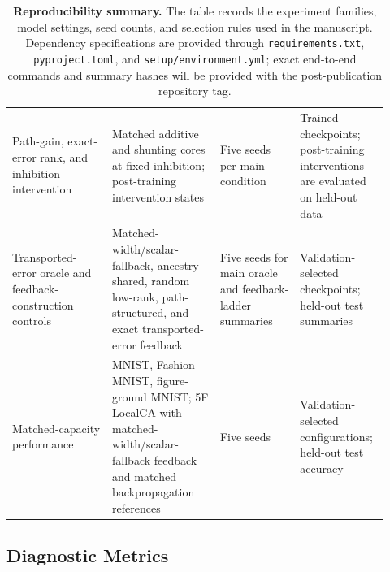 \begin{table}[htbp]
\begin{tabular}{@{}L{0.25\linewidth}L{0.27\linewidth}L{0.20\linewidth}L{0.20\linewidth}@{}}
    Path-gain, exact-error rank, and inhibition intervention & Matched additive and shunting cores at fixed inhibition; post-training intervention states & Five seeds per main condition & Trained checkpoints; post-training interventions are evaluated on held-out data \\
    Transported-error oracle and feedback-construction controls & Matched-width/scalar-fallback, ancestry-shared, random low-rank, path-structured, and exact transported-error feedback & Five seeds for main oracle and feedback-ladder summaries & Validation-selected checkpoints; held-out test summaries \\
    Matched-capacity performance & MNIST, Fashion-MNIST, figure-ground MNIST; 5F LocalCA with matched-width/scalar-fallback feedback and matched backpropagation references & Five seeds & Validation-selected configurations; held-out test accuracy \\
    \bottomrule
    \end{tabular}
    \caption{\textbf{Reproducibility summary.} The table records the experiment families, model settings, seed counts, and selection rules used in the manuscript. Dependency specifications are provided through \texttt{requirements.txt}, \texttt{pyproject.toml}, and \texttt{setup/environment.yml}; exact end-to-end commands and summary hashes will be provided with the post-publication repository tag.}
    \label{tab:reproducibility_summary}
    \end{table}
    
    \subsection{Diagnostic Metrics}
    
